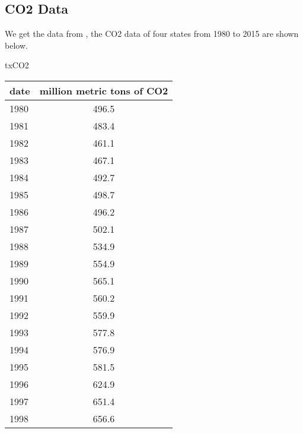 \documentclass{mcmthesis}
\begin{document}
\begin{appendices}


\section{CO2 Data}

We get the data from \cite{CO2}, the CO2 data of four states from 1980 to 2015 are shown below.

\begin{minipage}{\textwidth}
  \begin{minipage}[t]{0.45\textwidth}
    \centering
      \makeatletter{}\makeatother\caption{txCO2}
      \begin{tabular}{|l|c|}
        \hline
        date & million metric tons of CO2 \\ \hline
        1980 & 496.5                      \\ \hline
        1981 & 483.4                      \\ \hline
        1982 & 461.1                      \\ \hline
        1983 & 467.1                      \\ \hline
        1984 & 492.7                      \\ \hline
        1985 & 498.7                      \\ \hline
        1986 & 496.2                      \\ \hline
        1987 & 502.1                      \\ \hline
        1988 & 534.9                      \\ \hline
        1989 & 554.9                      \\ \hline
        1990 & 565.1                      \\ \hline
        1991 & 560.2                      \\ \hline
        1992 & 559.9                      \\ \hline
        1993 & 577.8                      \\ \hline
        1994 & 576.9                      \\ \hline
        1995 & 581.5                      \\ \hline
        1996 & 624.9                      \\ \hline
        1997 & 651.4                      \\ \hline
        1998 & 656.6                      \\ \hline

\end{tabular}
\end{minipage}
\end{minipage}
\end{appendices}
\end{document}
